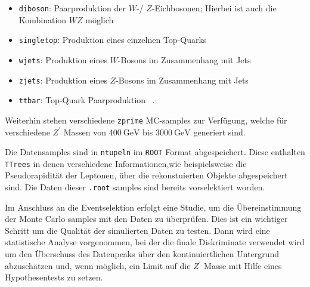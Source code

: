 \begin{itemize}
    \item \texttt{diboson}: Paarproduktion der $W$-/ $Z$-Eichbosonen; Hierbei ist auch die Kombination $WZ$ möglich
    \item \texttt{singletop}: Produktion eines einzelnen Top-Quarks
    \item \texttt{wjets}: Produktion eines $W$-Bosons im Zusammenhang mit Jets
    \item \texttt{zjets}: Produktion eines $Z$-Bosons im Zusammenhang mit Jets
    \item \texttt{ttbar}: Top-Quark Paarproduktion \, .
\end{itemize}

Weiterhin stehen verschiedene \texttt{zprime} MC-samples zur Verfügung, welche für verschiedene $Z^\prime$ Massen von $\SI{400}{\giga\electronvolt}$ bis
$\SI{3000}{\giga\electronvolt}$ generiert sind. \par
Die Datensamples sind in \texttt{ntupeln} im \texttt{ROOT} Format abgespeichert. Diese enthalten \texttt{TTrees} in denen verschiedene Informationen,wie beispielsweise
die Pseudorapidität der Leptonen, über
die rekonstuierten Objekte abgespeichert sind. Die Daten dieser \texttt{.root} samples sind bereits vorselektiert worden. \par

Im Anschluss an die Eventselektion erfolgt eine Studie, um die Übereinstimmung der Monte Carlo samples mit den Daten zu überprüfen. Dies ist ein wichtiger
Schritt um die Qualität der simulierten Daten zu testen. Dann wird eine statistische Analyse vorgenommen, bei der die finale Diskriminate verwendet wird
um den Überschuss des Datenpeaks über den kontinuiertlichen Untergrund abzuschätzen und, wenn möglich, ein Limit auf die $Z^\prime$ Masse mit Hilfe eines
Hypothesentests zu setzen.
